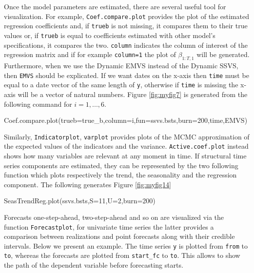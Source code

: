 \documentclass[
  12pt,
]{book}
\newenvironment{Shaded}{\begin{snugshade}}{\end{snugshade}}
\newcommand{\AttributeTok}[1]{\textcolor[rgb]{0.77,0.63,0.00}{#1}}
\newcommand{\DecValTok}[1]{\textcolor[rgb]{0.00,0.00,0.81}{#1}}
\newcommand{\FunctionTok}[1]{\textcolor[rgb]{0.00,0.00,0.00}{#1}}
\newcommand{\NormalTok}[1]{#1}
\theoremstyle{break}
\theoremstyle{nonumberplain}
\begin{document}
Once the model parameters are estimated, there are several useful tool
for visualization. For example, \texttt{Coef.compare.plot} provides the
plot of the estimated regression coefficients and, if \texttt{trueb} is
not missing, it compares them to their true values or, if \texttt{trueb}
is equal to coefficients estimated with other model's specifications, it
compares the two. \texttt{column} indicates the column of interest of
the regression matrix and if for example \texttt{column=1} the plot of
\(\beta_{1:T,1}\) will be generated. Furthermore, when we use the
Dynamic EMVS instead of the Dynamic SSVS, then \texttt{EMVS} should be
explicated. If we want dates on the x-axis then \texttt{time} must be
equal to a date vector of the same length of \texttt{y}, otherwise if
\texttt{time} is missing the x-axis will be a vector of natural numbers.
Figure \ref{fig:myfig7} is generated from the following command for
\(i=1,...,6\).

\begin{Shaded}
\begin{Highlighting}[]
\FunctionTok{Coef.compare.plot}\NormalTok{(}\AttributeTok{trueb=}\NormalTok{true\_b,}\AttributeTok{column=}\NormalTok{i,}\AttributeTok{fun=}\NormalTok{ssvs.bsts,}\AttributeTok{burn=}\DecValTok{200}\NormalTok{,time,EMVS)}
\end{Highlighting}
\end{Shaded}

Similarly, \texttt{Indicatorplot}, \texttt{varplot} provides plots of
the MCMC approximation of the expected values of the indicators and the
variance. \texttt{Active.coef.plot} instead shows how many variables are
relevant at any moment in time. If structural time series components are
estimated, they can be represented by the two following function which
plots respectively the trend, the seasonality and the regression
component. The following generates Figure \ref{fig:myfig14}

\begin{Shaded}
\begin{Highlighting}[]
\FunctionTok{SeasTrendReg.plot}\NormalTok{(ssvs.bsts,}\AttributeTok{S=}\DecValTok{11}\NormalTok{,}\AttributeTok{U=}\DecValTok{2}\NormalTok{,}\AttributeTok{burn=}\DecValTok{200}\NormalTok{)}
\end{Highlighting}
\end{Shaded}

Forecasts one-step-ahead, two-step-ahead and so on are visualized via
the function \texttt{Forecastplot}, for univariate time series the
latter provides a comparison between realizations and point forecasts
along with their credible intervals. Below we present an example. The
time series \texttt{y} is plotted from \texttt{from} to \texttt{to},
whereas the forecasts are plotted from \texttt{start\_fc} to
\texttt{to}. This allows to show the path of the dependent variable
before forecasting starts.
\end{document}
